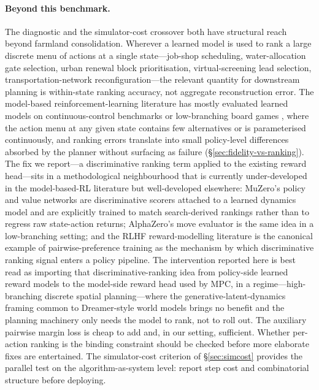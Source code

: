 \documentclass[11pt]{article}
\begin{document}
\paragraph{Beyond this benchmark.} The diagnostic and the simulator-cost crossover both have structural reach beyond farmland consolidation. Wherever a learned model is used to rank a large discrete menu of actions at a single state---job-shop scheduling, water-allocation gate selection, urban renewal block prioritisation, virtual-screening lead selection, transportation-network reconfiguration---the relevant quantity for downstream planning is within-state ranking accuracy, not aggregate reconstruction error. The model-based reinforcement-learning literature has mostly evaluated learned models on continuous-control benchmarks \citep{hafner2025dreamerv3,hansen2024tdmpc2,chua2018deep} or low-branching board games \citep{schrittwieser2020muzero}, where the action menu at any given state contains few alternatives or is parameterised continuously, and ranking errors translate into small policy-level differences absorbed by the planner without surfacing as failure (\S\ref{sec:fidelity-vs-ranking}). The fix we report---a discriminative ranking term applied to the existing reward head---sits in a methodological neighbourhood that is currently under-developed in the model-based-RL literature but well-developed elsewhere: MuZero's policy and value networks \citep{schrittwieser2020muzero} are discriminative scorers attached to a learned dynamics model and are explicitly trained to match search-derived rankings rather than to regress raw state-action returns; AlphaZero's move evaluator is the same idea in a low-branching setting; and the RLHF reward-modelling literature \citep{christiano2017deep,ouyang2022training,burges2010ranknet} is the canonical example of pairwise-preference training as the mechanism by which discriminative ranking signal enters a policy pipeline. The intervention reported here is best read as importing that discriminative-ranking idea from policy-side learned reward models to the model-side reward head used by MPC, in a regime---high-branching discrete spatial planning---where the generative-latent-dynamics framing common to Dreamer-style world models \citep{hafner2025dreamerv3,ha2018world} brings no benefit and the planning machinery only needs the model to rank, not to roll out. The auxiliary pairwise margin loss is cheap to add and, in our setting, sufficient. Whether per-action ranking is the binding constraint should be checked before more elaborate fixes are entertained. The simulator-cost criterion of \S\ref{sec:simcost} provides the parallel test on the algorithm-as-system level: report step cost and combinatorial structure before deploying.
\end{document}
